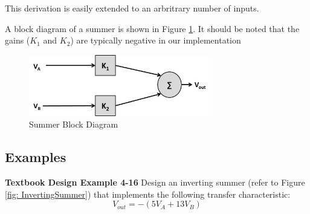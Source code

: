 \documentclass{handout}
\begin{document}

This derivation is easily extended to an arbritrary number of inputs.

A block diagram of a summer is shown in Figure \ref{fig: SummerBlockDiagram}.  It should be noted that the gains ($K_1$ and $K_2$) are typically negative in our implementation

\begin{figure} [h!]
\centering
\includegraphics[width=0.7\textwidth]{SummerBlockDiagram.jpg}
\caption{Summer Block Diagram}
\label{fig: SummerBlockDiagram}
\end{figure}

\subsection{Examples}

\textbf{Textbook Design Example 4-16}
Design an inverting summer (refer to Figure \ref{fig: InvertingSummer}) that implements the following transfer characteristic:
\begin{equation}
V_{out} = -(5V_A + 13 V_B)
\end{equation}
\end{document}
